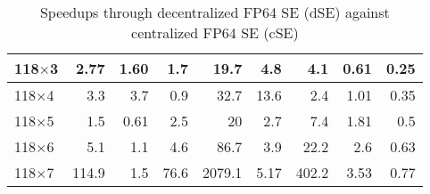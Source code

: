 \documentclass[thesis.tex]{subfiles}
\begin{document}
{\begin{table}[H]
\begin{tabular}{|l|r|r|r|r|r|r|r|r|}
		118$\times$3                                                                                                & 2.77                              & 1.60                              & {\color[HTML]{009901} 1.7}                              & 19.7                              & 4.8                               & {\color[HTML]{009901} 4.1}                              & 0.61                                                & 0.25                                                \\ \hline
		118$\times$4                                                                                                & 3.3                               & 3.7                               & {\color[HTML]{CB0000} 0.9}                              & 32.7                              & 13.6                              & {\color[HTML]{009901} 2.4}                              & 1.01                                                & 0.35                                                \\ \hline
		118$\times$5                                                                                                & 1.5                               & 0.61                              & {\color[HTML]{009901} 2.5}                              & 20                                & 2.7                               & {\color[HTML]{009901} 7.4}                              & 1.81                                                & 0.5                                                 \\ \hline
		118$\times$6                                                                                                & 5.1                               & 1.1                               & {\color[HTML]{009901} 4.6}                              & 86.7                              & 3.9                               & {\color[HTML]{009901} 22.2}                             & 2.6                                                 & 0.63                                                \\ \hline
		118$\times$7                                                                                                & 114.9                             & 1.5                               & {\color[HTML]{009901} 76.6}                             &    2079.1                               &   5.17                                &  {\color[HTML]{009901} 402.2}                                                         & 3.53                                                & 0.77                                                \\ \hline
	\end{tabular}
	\caption{Speedups through decentralized FP64 SE (dSE) against centralized FP64 SE (cSE)}
	\label{table:decentralizedSEsummary}
\end{table}}

\subfilebib %
\end{document}
